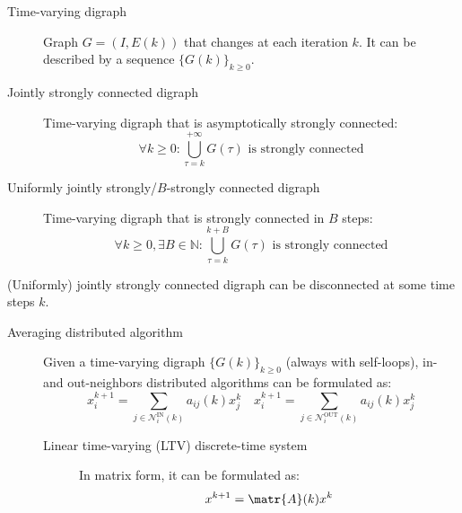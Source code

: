 \begin{description}
    \item[Time-varying digraph] 
        Graph $G=(I, E(k))$ that changes at each iteration $k$. It can be described by a sequence $\{ G(k) \}_{k \geq 0}$.

    \item[Jointly strongly connected digraph] 
        Time-varying digraph that is asymptotically strongly connected:
        \[ \forall k \geq 0: \bigcup_{\tau=k}^{+\infty} G(\tau) \text{ is strongly connected} \]

    \item[Uniformly jointly strongly/$B$-strongly connected digraph]   
        Time-varying digraph that is strongly connected in $B$ steps:
        \[ \forall k \geq 0, \exists B \in \mathbb{N}: \bigcup_{\tau=k}^{k+B} G(\tau) \text{ is strongly connected} \]
\end{description}

\begin{remark}
    (Uniformly) jointly strongly connected digraph can be disconnected at some time steps $k$.
\end{remark}

\begin{description}
    \item[Averaging distributed algorithm] 
        Given a time-varying digraph $\{ G(k) \}_{k \geq 0}$ (always with self-loops), in- and out-neighbors distributed algorithms can be formulated as:
        \[
            x_i^{k+1} = \sum_{j \in \mathcal{N}_i^\text{IN}(k)} a_{ij}(k) x_j^k
            \quad
            x_i^{k+1} = \sum_{j \in \mathcal{N}_i^\text{OUT}(k)} a_{ij}(k) x_j^k
        \]

        \begin{description}
            \item[Linear time-varying (LTV) discrete-time system] 
                In matrix form, it can be formulated as:
                \[ x^{k+1} = \matr{A}(k) x^k \]
        \end{description}
\end{description}

